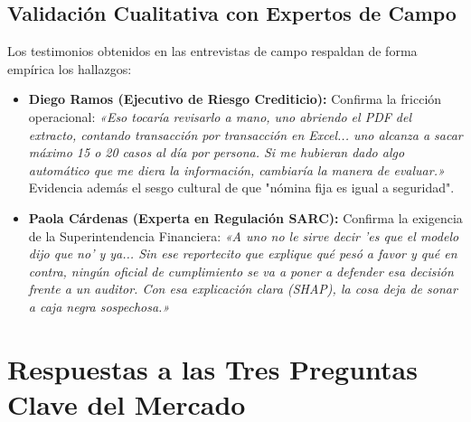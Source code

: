 \documentclass[11pt,a4paper]{article}
\begin{document}
\subsection{Validación Cualitativa con Expertos de Campo}
Los testimonios obtenidos en las entrevistas de campo respaldan de forma empírica los hallazgos:
\begin{itemize}[leftmargin=*]
    \item \textbf{Diego Ramos (Ejecutivo de Riesgo Crediticio):} Confirma la fricción operacional: \textit{«Eso tocaría revisarlo a mano, uno abriendo el PDF del extracto, contando transacción por transacción en Excel... uno alcanza a sacar máximo 15 o 20 casos al día por persona. Si me hubieran dado algo automático que me diera la información, cambiaría la manera de evaluar.»} Evidencia además el sesgo cultural de que "nómina fija es igual a seguridad".
    \item \textbf{Paola Cárdenas (Experta en Regulación SARC):} Confirma la exigencia de la Superintendencia Financiera: \textit{«A uno no le sirve decir 'es que el modelo dijo que no' y ya... Sin ese reportecito que explique qué pesó a favor y qué en contra, ningún oficial de cumplimiento se va a poner a defender esa decisión frente a un auditor. Con esa explicación clara (SHAP), la cosa deja de sonar a caja negra sospechosa.»}
\end{itemize}

\section{Respuestas a las Tres Preguntas Clave del Mercado}
\end{document}
